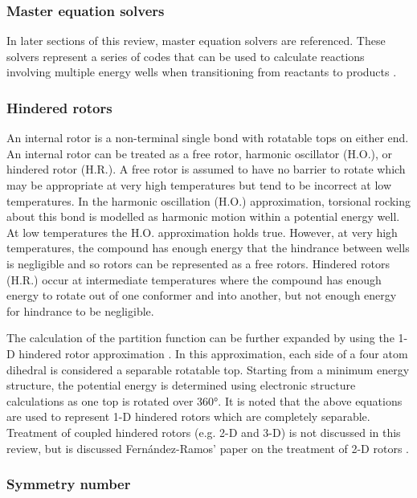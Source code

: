 \documentclass[preprint, 11pt]{elsarticle} %
\begin{document}
\subsubsection{Master equation solvers}

In later sections of this review, master equation solvers are referenced.
These solvers represent a series of codes that can be used to calculate reactions involving multiple energy wells when transitioning from reactants to products \cite{}.


\subsubsection{Hindered rotors}

An internal rotor is a non-terminal single bond with rotatable tops on either end. 
An internal rotor can be treated as a free rotor, harmonic oscillator (H.O.), or hindered rotor (H.R.).
A free rotor is assumed to have no barrier to rotate which may be appropriate at very high temperatures but tend to be incorrect at low temperatures.
In the harmonic oscillation (H.O.) approximation, torsional rocking about this bond is modelled as harmonic motion within a potential energy well.
At low temperatures the H.O. approximation holds true. 
However, at very high temperatures, the compound has enough energy that the hindrance between wells is negligible and so rotors can be represented as a free rotors. 
Hindered rotors (H.R.) occur at intermediate temperatures where the compound has enough energy to rotate out of one conformer and into another, but not enough energy for hindrance to be negligible.

The calculation of the partition function can be further expanded by using the 1-D hindered rotor approximation \cite{pfaendtner:2007}.
In this approximation, each side of a four atom dihedral is considered a separable rotatable top.
Starting from a minimum energy structure, the potential energy is determined using electronic structure calculations as one top is rotated over \ang{360}. 
It is noted that the above equations are used to represent 1-D hindered rotors which are completely separable.
Treatment of coupled hindered rotors (e.g. 2-D and 3-D) is not discussed in this review, but is discussed Fern\'andez-Ramos' paper on the treatment of 2-D rotors \cite{fernandez:2013}.


\subsubsection{Symmetry number}
\end{document}
